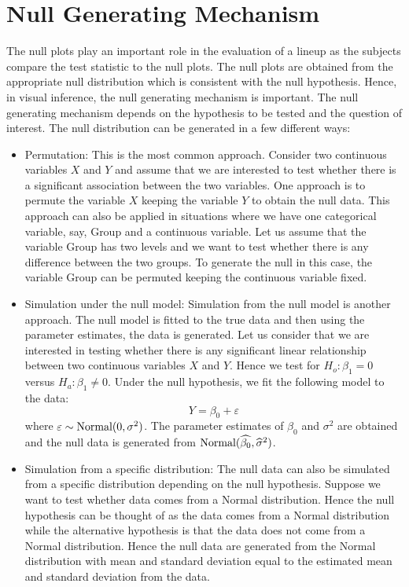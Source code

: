 \documentclass[12]{article}
\begin{document}
\section{Null Generating Mechanism}

The null plots play an important role in the evaluation of a lineup as the subjects compare the test statistic to the null plots. The null plots are obtained from the appropriate null distribution which is consistent with the null hypothesis.  Hence, in visual inference, the null generating mechanism is important. The null generating mechanism depends on the hypothesis to be tested and the question of interest. The null distribution can be generated in a few different ways:
\begin{itemize}
\item Permutation: This is the most common approach. Consider two continuous variables $X$ and $Y$ and assume that we are interested to test whether there is a significant association between the two variables. One approach is to permute the variable $X$ keeping the variable $Y$ to obtain the null data. This approach can also be applied in situations where we have one categorical variable, say, Group and a continuous variable. Let us assume that the variable Group has two levels and we want to test whether there is any difference between the two groups. To generate the null in this case,  the variable Group can be permuted keeping the continuous variable fixed.
\item Simulation under the null model: Simulation from the null model is another approach. The null model is fitted to the true data and then using the parameter estimates, the data is generated. Let us consider that we are interested in testing whether there is any significant linear relationship between two continuous variables $X$ and $Y$. Hence we test for $H_o : \beta_1 = 0$ versus $H_a: \beta_1 \ne 0$. Under the null hypothesis, we fit the following model to the data:
$$Y = \beta_0 + \varepsilon$$
where $\varepsilon \sim \hbox{Normal}(0, \sigma^2)$. The parameter estimates of $\beta_0$ and $\sigma^2$ are obtained and the null data is generated from $\hbox{Normal}(\widehat{\beta_0}, \widehat{\sigma}^2)$. 
\item Simulation from a specific distribution: The null data can also be simulated from a specific distribution depending on the null hypothesis. Suppose we want to test whether data comes from a Normal distribution. Hence the null hypothesis can be thought of as the data comes from a Normal distribution while the alternative hypothesis is that the data does not come from a Normal distribution. Hence the null data are generated from the Normal distribution with mean and standard deviation equal to the estimated mean and standard deviation from the data. 
\end{itemize} 
\end{document}
